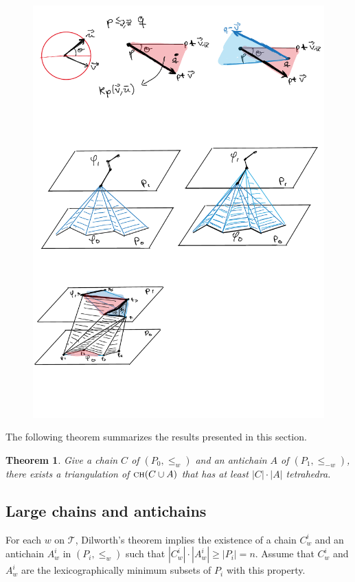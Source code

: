 \documentclass[a4paper, 11pt]{article}
\newtheorem{theorem}{Theorem}[section]
\newcommand{\we}{{\ensuremath{w}}}
\newcommand{\ch}[1]{\ensuremath{\textsc{ch}(#1)}}
\newcommand{\lt}{\ensuremath{ \leq_{\we}}}
\newcommand{\ltc}{\ensuremath{ \leq_{-\we}}}
\newcommand{\torus}{\ensuremath{\mathcal T}}
\begin{document}
\begin{figure}[tb]
\centering
\includegraphics[width=1\textwidth]{img/CompleteTriangulation.pdf}
\caption{\small }
\label{fig:CompleteTriangulation}
\end{figure}
The following theorem summarizes the results presented in this section. 

\begin{theorem}\label{thm:Quadratic size Triangulation}
Give a chain $C$ of $(P_0, \lt)$ and  an antichain $A$ of $(P_1, \ltc)$,
there exists a triangulation of $\ch{C\cup A}$ that has at least $|C|\cdot |A|$ tetrahedra.
\end{theorem}


\subsection{Large chains and antichains}
For each $\we$ on $\torus$, Dilworth's theorem implies the existence of a chain $C^i_{\we}$ and an antichain $A^i_{\we}$ in $(P_i, \lt)$ such that  $|C^i_{\we}|\cdot |A^i_{\we}| \geq |P_i| = n$.
Assume that $C^i_{\we}$ and $A^i_{\we}$ are the lexicographically minimum subsets of $P_i$ with this property. 
\end{document}
